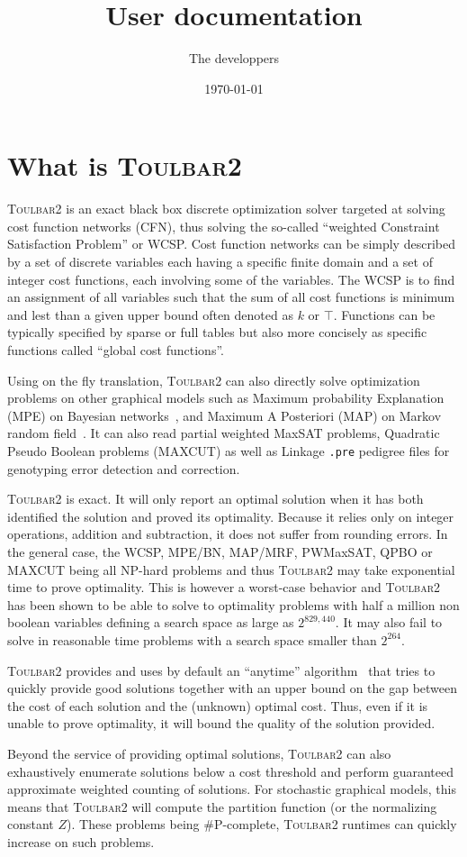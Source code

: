 \documentclass{article}
\title{\toulbar2 User documentation}
\author{The \toulbar2 developpers}
\date{\today}
\def\toulbar2{\textsc{Toulbar2}}
\begin{document}
\section{What is \toulbar2}

\toulbar2 is an exact black box discrete optimization solver targeted
at solving cost function networks (CFN), thus solving the so-called
``weighted Constraint Satisfaction Problem'' or WCSP. Cost function
networks can be simply described by a set of discrete variables each
having a specific finite domain and a set of integer cost functions,
each involving some of the variables. The WCSP is to find an
assignment of all variables such that the sum of all cost functions is
minimum and lest than a given upper bound often denoted as $k$ or
$\top$. Functions can be typically specified by sparse or full tables
but also more concisely as specific functions called ``global cost
functions''.

Using on the fly translation, \toulbar2 can also directly solve
optimization problems on other graphical models such as Maximum
probability Explanation (MPE) on Bayesian networks~\cite{}, and
Maximum A Posteriori (MAP) on Markov random field~\cite{}. It can also
read partial weighted MaxSAT problems, Quadratic Pseudo Boolean
problems (MAXCUT) as well as Linkage \texttt{.pre} pedigree files for
genotyping error detection and correction.

\toulbar2 is exact. It will only report an optimal solution when it
has both identified the solution and proved its optimality. Because it
relies only on integer operations, addition and subtraction, it does
not suffer from rounding errors. In the general case, the WCSP,
MPE/BN, MAP/MRF, PWMaxSAT, QPBO or MAXCUT being all NP-hard problems
and thus \toulbar2 may take exponential time to prove optimality. This
is however a worst-case behavior and \toulbar2 has been shown to be
able to solve to optimality problems with half a million non boolean
variables defining a search space as large as $2^{829,440}$. It may
also fail to solve in reasonable time problems with a search space
smaller than $2^{264}$.

\toulbar2 provides and uses by default an ``anytime''
algorithm~\cite{} that tries to quickly provide good solutions together
with an upper bound on the gap between the cost of each solution and
the (unknown) optimal cost. Thus, even if it is unable to prove
optimality, it will bound the quality of the solution provided.

Beyond the service of providing optimal solutions, \toulbar2 can also
exhaustively enumerate solutions below a cost threshold and
perform guaranteed approximate weighted counting of solutions. For
stochastic graphical models, this means that \toulbar2 will compute
the partition function (or the normalizing constant $Z$). These
problems being \#P-complete, \toulbar2 runtimes can quickly increase
on such problems.
\end{document}
